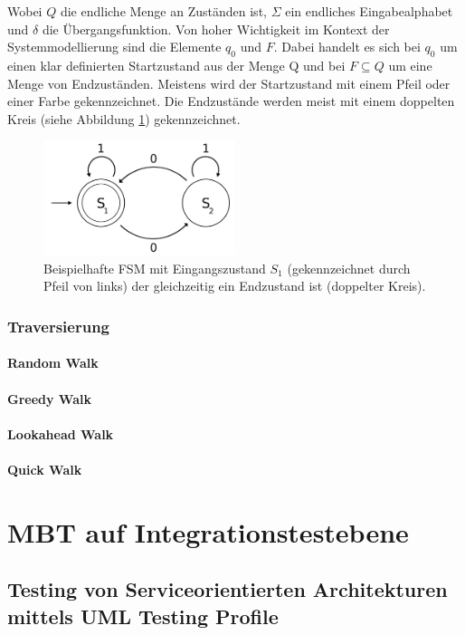 Wobei $Q$ die endliche Menge an Zuständen ist, $\Sigma$ ein endliches Eingabealphabet und $\delta$ die Übergangsfunktion. Von hoher Wichtigkeit im Kontext der Systemmodellierung sind die Elemente $q_0$ und $F$. Dabei handelt es sich bei $q_0$ um einen klar definierten Startzustand aus der Menge Q und bei $F \subseteq Q$ um eine Menge von Endzuständen. Meistens wird der Startzustand mit einem Pfeil oder einer Farbe gekennzeichnet. Die Endzustände werden meist mit einem doppelten Kreis (siehe Abbildung \ref{fig:fsm_example}) gekennzeichnet.

\begin{figure}[h] 
  \centering
     \includegraphics[width=0.5\textwidth]{figures/FSM_example.png}
  \caption{Beispielhafte FSM mit Eingangszustand $S_1$ (gekennzeichnet durch Pfeil von links) der gleichzeitig ein Endzustand ist (doppelter Kreis).}
  \label{fig:fsm_example}
\end{figure}


\subsubsection{Traversierung}
\paragraph{Random Walk}
\paragraph{Greedy Walk}
\paragraph{Lookahead Walk}
\paragraph{Quick Walk}


\section{MBT auf Integrationstestebene}
\subsection{Testing von Serviceorientierten Architekturen mittels UML Testing Profile}


